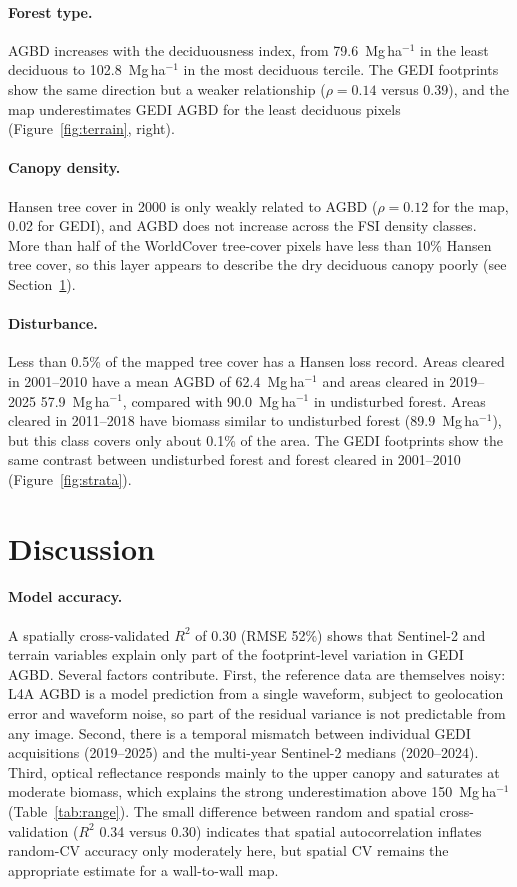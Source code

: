 \documentclass[11pt,a4paper]{article}
\newcommand{\mgha}{Mg\,ha$^{-1}$}
\newcommand{\rsq}{$R^2$}
\begin{document}
\paragraph{Forest type.} AGBD increases with the deciduousness index, from 79.6~\mgha{} in the
least deciduous to 102.8~\mgha{} in the most deciduous tercile. The GEDI footprints show the same
direction but a weaker relationship ($\rho=0.14$ versus 0.39), and the map underestimates GEDI
AGBD for the least deciduous pixels (Figure~\ref{fig:terrain}, right).

\paragraph{Canopy density.} Hansen tree cover in 2000 is only weakly related to AGBD
($\rho=0.12$ for the map, 0.02 for GEDI), and AGBD does not increase across the FSI density
classes. More than half of the WorldCover tree-cover pixels have less than 10\% Hansen tree
cover, so this layer appears to describe the dry deciduous canopy poorly (see
Section~\ref{sec:disc}).

\paragraph{Disturbance.} Less than 0.5\% of the mapped tree cover has a Hansen loss record.
Areas cleared in 2001--2010 have a mean AGBD of 62.4~\mgha{} and areas cleared in 2019--2025
57.9~\mgha{}, compared with 90.0~\mgha{} in undisturbed forest. Areas cleared in 2011--2018 have
biomass similar to undisturbed forest (89.9~\mgha{}), but this class covers only about 0.1\% of the
area. The GEDI footprints show the same contrast between undisturbed forest and forest cleared in
2001--2010 (Figure~\ref{fig:strata}).

\section{Discussion}
\label{sec:disc}

\paragraph{Model accuracy.} A spatially cross-validated \rsq{} of 0.30 (RMSE 52\%) shows that
Sentinel-2 and terrain variables explain only part of the footprint-level variation in GEDI
AGBD. Several factors contribute. First, the reference data are themselves noisy: L4A AGBD is a
model prediction from a single waveform, subject to geolocation error and waveform noise, so
part of the residual variance is not predictable from any image. Second, there is a temporal
mismatch between individual GEDI acquisitions (2019--2025) and the multi-year Sentinel-2 medians
(2020--2024). Third, optical reflectance responds mainly to the upper canopy and saturates at
moderate biomass, which explains the strong underestimation above 150~\mgha{}
(Table~\ref{tab:range}). The small difference between random and spatial cross-validation
(\rsq{} 0.34 versus 0.30) indicates that spatial autocorrelation inflates random-CV accuracy
only moderately here, but spatial CV remains the appropriate estimate for a wall-to-wall map.
\end{document}
